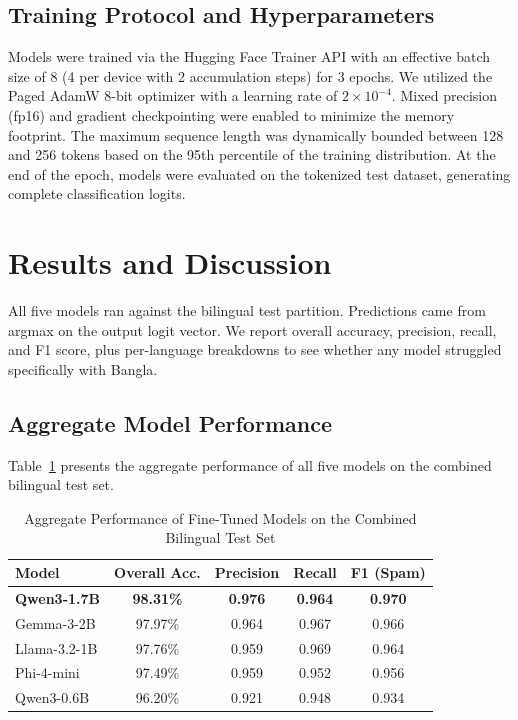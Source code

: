 \documentclass[journal]{IEEEtran}
\begin{document}
\subsection{Training Protocol and Hyperparameters}

Models were trained via the Hugging Face Trainer API with an effective batch size of 8 (4 per device with 2 accumulation steps) for 3 epochs. We utilized the Paged AdamW 8-bit optimizer with a learning rate of $2 \times 10^{-4}$. Mixed precision (fp16) and gradient checkpointing were enabled to minimize the memory footprint. The maximum sequence length was dynamically bounded between 128 and 256 tokens based on the 95th percentile of the training distribution. At the end of the epoch, models were evaluated on the tokenized test dataset, generating complete classification logits.

\section{Results and Discussion}

All five models ran against the bilingual test partition. Predictions came from argmax on the output logit vector. We report overall accuracy, precision, recall, and F1 score, plus per-language breakdowns to see whether any model struggled specifically with Bangla.

\subsection{Aggregate Model Performance}

Table~\ref{tab:aggregate_results} presents the aggregate performance of all five models on the combined bilingual test set.

\begin{table}[htbp]
\caption{Aggregate Performance of Fine-Tuned Models on the Combined Bilingual Test Set}
\label{tab:aggregate_results}
\centering
\begin{tabular}{lcccc}
\toprule
\textbf{Model} & \textbf{Overall Acc.} & \textbf{Precision} & \textbf{Recall} & \textbf{F1 (Spam)} \\
\midrule
\textbf{Qwen3-1.7B} & \textbf{98.31\%} & \textbf{0.976} & \textbf{0.964} & \textbf{0.970} \\
Gemma-3-2B & 97.97\% & 0.964 & 0.967 & 0.966 \\
Llama-3.2-1B & 97.76\% & 0.959 & 0.969 & 0.964 \\
Phi-4-mini & 97.49\% & 0.959 & 0.952 & 0.956 \\
Qwen3-0.6B & 96.20\% & 0.921 & 0.948 & 0.934 \\
\bottomrule
\end{tabular}
\end{table}
\end{document}
